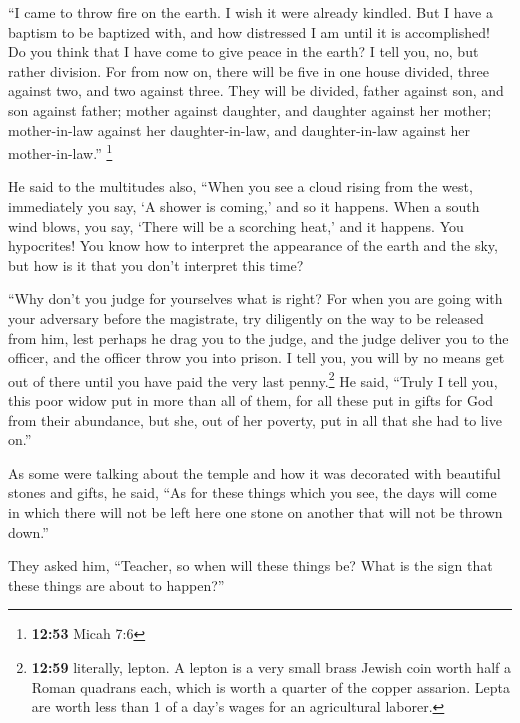  ``I came to throw fire on the earth. I wish it were
already kindled.  But I have a baptism to be baptized
with, and how distressed I am until it is accomplished! 
Do you think that I have come to give peace in the earth? I tell you,
no, but rather division.  For from now on, there will be
five in one house divided, three against two, and two against three.
 They will be divided, father against son, and son
against father; mother against daughter, and daughter against her
mother; mother-in-law against her daughter-in-law, and daughter-in-law
against her mother-in-law.'' \footnote{\textbf{12:53} Micah 7:6}

 He said to the multitudes also, ``When you see a cloud
rising from the west, immediately you say, `A shower is coming,' and so
it happens.  When a south wind blows, you say, `There
will be a scorching heat,' and it happens.  You
hypocrites! You know how to interpret the appearance of the earth and
the sky, but how is it that you don't interpret this time?

 ``Why don't you judge for yourselves what is right?
 For when you are going with your adversary before the
magistrate, try diligently on the way to be released from him, lest
perhaps he drag you to the judge, and the judge deliver you to the
officer, and the officer throw you into prison.  I tell
you, you will by no means get out of there until you have paid the very
last penny.\footnote{\textbf{12:59} literally, lepton. A lepton is a
  very small brass Jewish coin worth half a Roman quadrans each, which
  is worth a quarter of the copper assarion. Lepta are worth less than 1
  of a day's wages for an agricultural laborer.}  He said,
``Truly I tell you, this poor widow put in more than all of them,
 for all these put in gifts for God from their abundance,
but she, out of her poverty, put in all that she had to live on.''

 As some were talking about the temple and how it was
decorated with beautiful stones and gifts, he said,  ``As
for these things which you see, the days will come in which there will
not be left here one stone on another that will not be thrown down.''

 They asked him, ``Teacher, so when will these things be?
What is the sign that these things are about to happen?''

